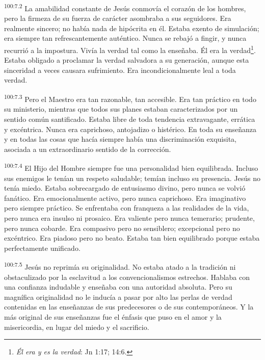 \documentclass[twoside, 11pt]{book}
\begin{document}
\par
\textsuperscript{100:7.2} La amabilidad constante de Jesús conmovía el corazón de los hombres, pero la firmeza de su fuerza de carácter asombraba a sus seguidores. Era realmente sincero; no había nada de hipócrita en él. Estaba exento de simulación; era siempre tan refrescantemente auténtico. Nunca se rebajó a fingir, y nunca recurrió a la impostura. Vivía la verdad tal como la enseñaba. Él era la verdad\footnote{\textit{Él era y es la verdad}: Jn 1:17; 14:6.}. Estaba obligado a proclamar la verdad salvadora a su generación, aunque esta sinceridad a veces causara sufrimiento. Era incondicionalmente leal a toda verdad.

\par
\textsuperscript{100:7.3} Pero el Maestro era tan razonable, tan accesible. Era tan práctico en todo su ministerio, mientras que todos sus planes estaban caracterizados por un sentido común santificado. Estaba libre de toda tendencia extravagante, errática y excéntrica. Nunca era caprichoso, antojadizo o histérico. En toda su enseñanza y en todas las cosas que hacía siempre había una discriminación exquisita, asociada a un extraordinario sentido de la corrección.

\par
\textsuperscript{100:7.4} El Hijo del Hombre siempre fue una personalidad bien equilibrada. Incluso sus enemigos le tenían un respeto saludable; temían incluso su presencia. Jesús no tenía miedo. Estaba sobrecargado de entusiasmo divino, pero nunca se volvió fanático. Era emocionalmente activo, pero nunca caprichoso. Era imaginativo pero siempre práctico. Se enfrentaba con franqueza a las realidades de la vida, pero nunca era insulso ni prosaico. Era valiente pero nunca temerario; prudente, pero nunca cobarde. Era compasivo pero no sensiblero; excepcional pero no excéntrico. Era piadoso pero no beato. Estaba tan bien equilibrado porque estaba perfectamente unificado.

\par
\textsuperscript{100:7.5} Jesús no reprimía su originalidad. No estaba atado a la tradición ni obstaculizado por la esclavitud a los convencionalismos estrechos. Hablaba con una confianza indudable y enseñaba con una autoridad absoluta. Pero su magnífica originalidad no le inducía a pasar por alto las perlas de verdad contenidas en las enseñanzas de sus predecesores o de sus contemporáneos. Y la más original de sus enseñanzas fue el énfasis que puso en el amor y la misericordia, en lugar del miedo y el sacrificio.
\end{document}
